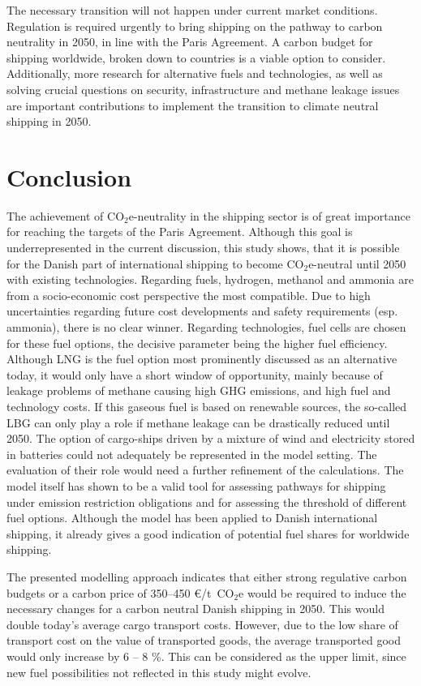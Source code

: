 \documentclass[article]{elsarticle}
\begin{document}
The necessary transition will not happen under current market conditions. Regulation is required urgently to bring shipping on the pathway to carbon neutrality in 2050, in line with the Paris Agreement. A carbon budget for shipping worldwide, broken down to countries is a viable option to consider. Additionally, more research for alternative fuels and technologies, as well as solving crucial questions on security, infrastructure and methane leakage issues are important contributions to implement the transition to climate neutral shipping in 2050. 


\section{Conclusion}
\label{sec:Conclusion}
The achievement of CO$_2$e-neutrality in the shipping sector is of great importance for reaching the targets of the Paris Agreement. Although this goal is underrepresented in the current discussion, this study shows, that it is possible for the Danish part of international shipping to become CO$_2$e-neutral until 2050 with existing technologies. Regarding fuels, hydrogen, methanol and ammonia are from a socio-economic cost perspective the most compatible. Due to high uncertainties regarding future cost developments and safety requirements (esp. ammonia), there is no clear winner. Regarding technologies, fuel cells are chosen for these fuel options, the decisive parameter being the higher fuel efficiency. Although LNG is the fuel option most prominently discussed as an alternative today, it would only have a short window of opportunity, mainly because of leakage problems of methane causing high GHG emissions, and high fuel and technology costs. If this gaseous fuel is based on renewable sources, the so-called LBG can only play a role if methane leakage can be drastically reduced until 2050. The option of cargo-ships driven by a mixture of wind and electricity stored in batteries could not adequately be represented in the model setting. The evaluation of their role would need a further refinement of the calculations. The model itself has shown to be a valid tool for assessing pathways for shipping under emission restriction obligations and for assessing the threshold of different fuel options. Although the model has been applied to Danish international shipping, it already gives a good indication of potential fuel shares for worldwide shipping.
 
The presented modelling approach indicates that either strong regulative carbon budgets or a carbon price of 350--450 \euro/t~CO$_2$e would be required to induce the necessary changes for a carbon neutral Danish shipping in 2050. This would double today's average cargo transport costs. However, due to the low share of transport cost on the value of transported goods, the average transported good would only increase by 6 -- 8 \%. This can be considered as the upper limit, since new fuel possibilities not reflected in this study might evolve.
\end{document}
